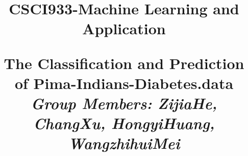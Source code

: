 \documentclass[runningheads]{llncs}
\begin{document}
    
\title{\large{CSCI933-Machine Learning and Application}
\author{}
\institute{}
\maketitle
\vspace{-1cm}



\begin{center}
\Large{\textbf{The Classification and Prediction of Pima-Indians-Diabetes.data}} \\ %
\vspace{0.2cm}
\large{\emph{Group Members: ZijiaHe, ChangXu, HongyiHuang, WangzhihuiMei}} \\%
\vspace{0.3cm}  
\end{center}


}
\end{document}
